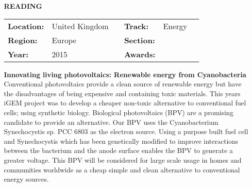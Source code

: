 \textbf{\uppercase{Reading}} \FloatBarrier \begin{table}[h] \begin{tabular}{lp{2.5cm}llll} \textbf{Location:} & United Kingdom & \multicolumn{1}{|l}{} & \textbf{Track:}   & Energy \\ \textbf{Region:}   & Europe   & \multicolumn{1}{|l}{} & \textbf{Section:} &  \\ \textbf{Year:}     & 2015   & \multicolumn{1}{|l}{} & \textbf{Awards:}  & \end{tabular} \end{table} \FloatBarrier \noindent\textbf{Innovating living photovoltaics: Renewable energy from Cyanobacteria} \vspace{.2cm}\\
Conventional photovoltaics provide a clean source of renewable energy but have the disadvantages of being expensive and containing toxic materials. This years iGEM project was to develop a cheaper non-toxic alternative to conventional fuel cells; using synthetic biology. Biological photovoltaics (BPV) are a promising candidate to provide an alternative. Our BPV uses the Cyanobacterium Synechocystis sp. PCC 6803 as the electron source. Using a purpose built fuel cell and Synechocystis which has been genetically modified to improve interactions between the bacterium and the anode surface enables the BPV to generate a greater voltage. This BPV will be considered for large scale usage in homes and communities worldwide as a cheap simple and clean alternative to conventional energy sources. 
\vspace{2cm}

